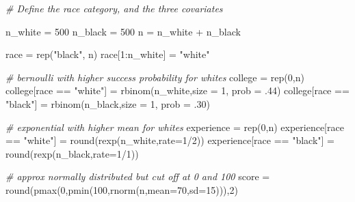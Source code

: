 \documentclass[
]{article}
\newenvironment{Shaded}{\begin{snugshade}}{\end{snugshade}}
\newcommand{\AttributeTok}[1]{\textcolor[rgb]{0.77,0.63,0.00}{#1}}
\newcommand{\CommentTok}[1]{\textcolor[rgb]{0.56,0.35,0.01}{\textit{#1}}}
\newcommand{\DecValTok}[1]{\textcolor[rgb]{0.00,0.00,0.81}{#1}}
\newcommand{\FunctionTok}[1]{\textcolor[rgb]{0.00,0.00,0.00}{#1}}
\newcommand{\NormalTok}[1]{#1}
\newcommand{\OtherTok}[1]{\textcolor[rgb]{0.56,0.35,0.01}{#1}}
\newcommand{\SpecialCharTok}[1]{\textcolor[rgb]{0.00,0.00,0.00}{#1}}
\newcommand{\StringTok}[1]{\textcolor[rgb]{0.31,0.60,0.02}{#1}}
\begin{document}
\begin{Shaded}
\begin{Highlighting}[]
\CommentTok{\# Define the race category, and the three covariates}

\NormalTok{n\_white }\OtherTok{=} \DecValTok{500}
\NormalTok{n\_black }\OtherTok{=} \DecValTok{500}
\NormalTok{n }\OtherTok{=}\NormalTok{ n\_white }\SpecialCharTok{+}\NormalTok{ n\_black}

\NormalTok{race }\OtherTok{=} \FunctionTok{rep}\NormalTok{(}\StringTok{"black"}\NormalTok{, n)}
\NormalTok{race[}\DecValTok{1}\SpecialCharTok{:}\NormalTok{n\_white] }\OtherTok{=} \StringTok{"white"}

\CommentTok{\# bernoulli with higher success probability for whites}
\NormalTok{college }\OtherTok{=} \FunctionTok{rep}\NormalTok{(}\DecValTok{0}\NormalTok{,n)}
\NormalTok{college[race }\SpecialCharTok{==} \StringTok{"white"}\NormalTok{] }\OtherTok{=} \FunctionTok{rbinom}\NormalTok{(n\_white,}\AttributeTok{size =} \DecValTok{1}\NormalTok{, }\AttributeTok{prob =}\NormalTok{ .}\DecValTok{44}\NormalTok{)}
\NormalTok{college[race }\SpecialCharTok{==} \StringTok{"black"}\NormalTok{] }\OtherTok{=} \FunctionTok{rbinom}\NormalTok{(n\_black,}\AttributeTok{size =} \DecValTok{1}\NormalTok{, }\AttributeTok{prob =}\NormalTok{ .}\DecValTok{30}\NormalTok{)}

\CommentTok{\# exponential with higher mean for whites}
\NormalTok{experience }\OtherTok{=} \FunctionTok{rep}\NormalTok{(}\DecValTok{0}\NormalTok{,n)}
\NormalTok{experience[race }\SpecialCharTok{==} \StringTok{"white"}\NormalTok{] }\OtherTok{=} \FunctionTok{round}\NormalTok{(}\FunctionTok{rexp}\NormalTok{(n\_white,}\AttributeTok{rate=}\DecValTok{1}\SpecialCharTok{/}\DecValTok{2}\NormalTok{))}
\NormalTok{experience[race }\SpecialCharTok{==} \StringTok{"black"}\NormalTok{] }\OtherTok{=} \FunctionTok{round}\NormalTok{(}\FunctionTok{rexp}\NormalTok{(n\_black,}\AttributeTok{rate=}\DecValTok{1}\SpecialCharTok{/}\DecValTok{1}\NormalTok{))}

\CommentTok{\# approx normally distributed but cut off at 0 and 100}
\NormalTok{score }\OtherTok{=} \FunctionTok{round}\NormalTok{(}\FunctionTok{pmax}\NormalTok{(}\DecValTok{0}\NormalTok{,}\FunctionTok{pmin}\NormalTok{(}\DecValTok{100}\NormalTok{,}\FunctionTok{rnorm}\NormalTok{(n,}\AttributeTok{mean=}\DecValTok{70}\NormalTok{,}\AttributeTok{sd=}\DecValTok{15}\NormalTok{))),}\DecValTok{2}\NormalTok{)}
\end{Highlighting}
\end{Shaded}
\end{document}
